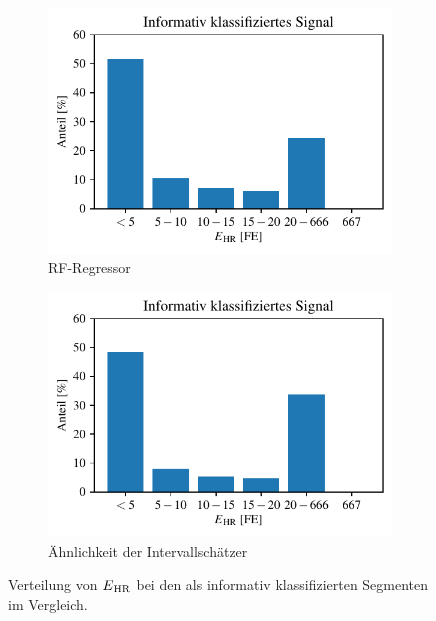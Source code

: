  \begin{figure}[h]
 	\centering
		\begin{subfigure}{.45\textwidth}
			\centering
 			\includegraphics[scale=0.7]{pic/rf-own-final-10-positives.pdf}
 			\caption{\ac{RF}-Regressor}
 		\end{subfigure}
    	\begin{subfigure}{.45\textwidth}
    		\centering
 			\includegraphics[scale=0.7]{pic/brueser03-otherylim-positives.pdf}
 			\caption{Ähnlichkeit der Intervallschätzer}
 		\end{subfigure}
 	\caption[Verteilung von $E\textsubscript{HR}$ bei den als informativ klassifizierten Segmenten im Vergleich.]{Verteilung von $E\textsubscript{HR}$ bei den als informativ klassifizierten Segmenten im Vergleich.}
 	\label{fig:own-10-positives}
 \end{figure}
 
